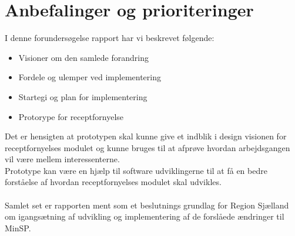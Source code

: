 \section{Anbefalinger og prioriteringer}
I denne forundersøgelse rapport har vi beskrevet følgende:
\begin{itemize}
	\item Visioner om den samlede forandring
	\item Fordele og ulemper ved implementering
	\item Startegi og plan for implementering
	\item Protorype for receptfornyelse
\end{itemize}
Det er hensigten at prototypen skal kunne give et indblik i design visionen for receptfornyelses modulet og kunne bruges til at afprøve hvordan arbejdsgangen vil være mellem interessenterne.\\
Prototype kan være en hjælp til software udviklingerne til at få en bedre forståelse af hvordan receptfornyelses modulet skal udvikles.\\\\
Samlet set er rapporten ment som et beslutnings grundlag for Region Sjælland om igangsætning af udvikling og implementering af de forslåede ændringer til MinSP.